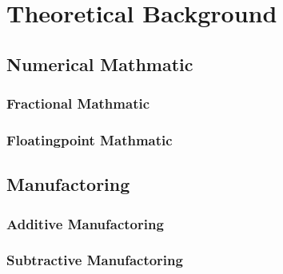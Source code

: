 \chapter{Theoretical Background}
\label{theoretical_background}

\section{Numerical Mathmatic}
\subsection{Fractional Mathmatic}
\subsection{Floatingpoint Mathmatic}

\section{Manufactoring}
\subsection{Additive Manufactoring}
\subsection{Subtractive Manufactoring}
